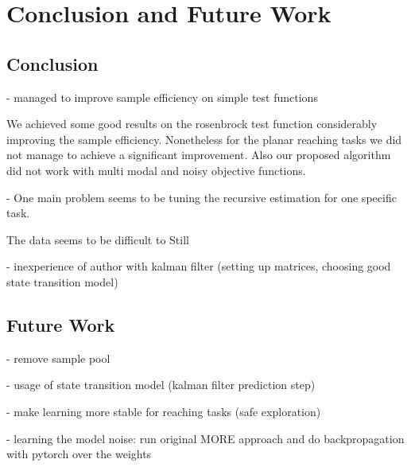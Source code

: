 
\chapter{Conclusion and Future Work}


\section{Conclusion}
- managed to improve sample efficiency on simple test functions

We achieved some good results on the rosenbrock test function
considerably improving the sample efficiency. Nonetheless for
the planar reaching tasks we did not manage to achieve a
significant improvement.
Also our proposed algorithm did not work with multi modal and noisy objective functions.

- One main problem seems to be tuning the recursive estimation for one specific
task.

The data seems to be difficult to Still

- inexperience of author with kalman filter (setting up matrices, choosing good state transition model)

\section{Future Work}
- remove sample pool

- usage of state transition model (kalman filter prediction step)

- make learning more stable for reaching tasks (safe exploration)

- learning the model noise: run original MORE approach and do backpropagation with pytorch over the
weights